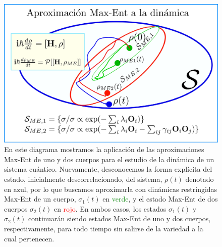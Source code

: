 \documentclass{report} %
\numberwithin{equation}{section}
\begin{document}
\begin{figure}
    \centering
    \includegraphics[scale=0.3]{figs/aprox-ME2_page-0001.jpg}
    \caption{En este diagrama mostramos la aplicación de las aproximaciones Max-Ent de uno y dos cuerpos para el estudio de la dinámica de un sistema cuántico. Nuevamente, desconocemos la forma explícita del estado, inicialmente descorrelacionado, del sistema, $\rho(t)$ denotado en azul, por lo que buscamos aproximarla con dinámicas restringidas Max-Ent de un cuerpo, $\sigma_1(t)$ en \textcolor{green}{verde}, y el estado Max-Ent de dos cuerpos  $\sigma_2(t)$ en \textcolor{red}{rojo}. En ambos casos, los estados $\sigma_1(t)$ y $\sigma_2(t)$ continuarán siendo estados Max-Ent de uno y dos cuerpos, respectivamente, para todo tiempo sin salirse de la variedad a la cual pertenecen. }
    \label{aprox-ME2_page-0001}
\end{figure}

\end{document}
